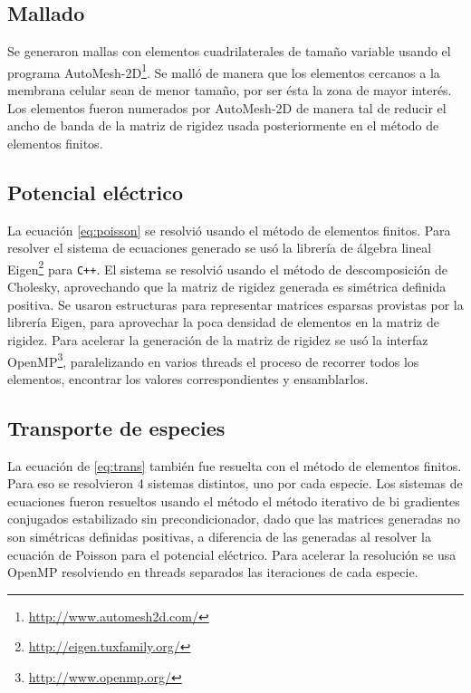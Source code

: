 \documentclass[a4paper,10pt]{article}
\begin{document}
\subsection{Mallado}
Se generaron mallas con elementos cuadrilaterales de tamaño variable usando el programa AutoMesh-2D\footnote{\href{http://www.automesh2d.com/}{http://www.automesh2d.com/}}. Se malló de manera que los elementos cercanos a la membrana celular sean de menor tamaño, por ser ésta la zona de mayor interés. Los elementos fueron numerados por AutoMesh-2D de manera tal de reducir el ancho de banda de la matriz de rigidez usada posteriormente en el método de elementos finitos. \\



\subsection{Potencial eléctrico}

La ecuación \ref{eq:poisson} se resolvió usando el método de elementos finitos. Para resolver el sistema de ecuaciones generado se usó la librería de álgebra lineal Eigen\footnote{\href{http://eigen.tuxfamily.org/}{http://eigen.tuxfamily.org/}} para \texttt{C++}. El sistema se resolvió usando el método de descomposición de Cholesky, aprovechando que la matriz de rigidez generada es simétrica definida positiva. Se usaron estructuras para representar matrices esparsas provistas por la librería Eigen, para aprovechar la poca densidad de elementos en la matriz de rigidez. Para acelerar la generación de la matriz de rigidez se usó la interfaz OpenMP\footnote{\href{http://www.openmp.org/}{http://www.openmp.org/}}, paralelizando en varios threads el proceso de recorrer todos los elementos, encontrar los valores correspondientes y ensamblarlos.\\


\subsection{Transporte de especies}

La ecuación de \ref{eq:trans} también fue resuelta con el método de elementos finitos. Para eso se resolvieron 4 sistemas distintos, uno por cada especie. Los sistemas de ecuaciones fueron resueltos usando el método el método iterativo de bi gradientes conjugados estabilizado sin precondicionador, dado que las matrices generadas no son simétricas definidas positivas, a diferencia de las generadas al resolver la ecuación de Poisson para el potencial eléctrico. Para acelerar la resolución se usa OpenMP resolviendo en threads separados las iteraciones de cada especie.\\
\end{document}
